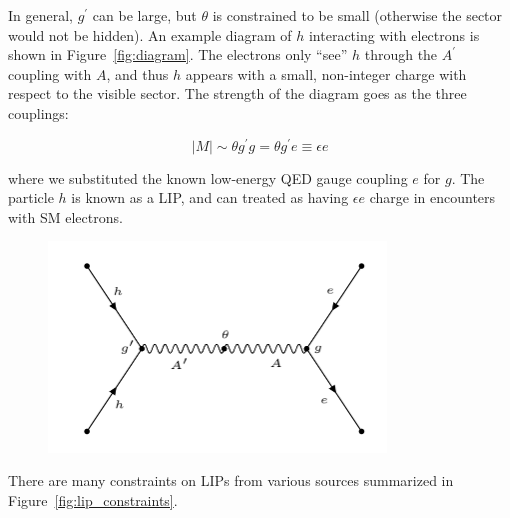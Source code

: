 In general, $g^{\prime}$ can be large, but $\theta$ is constrained to be small (otherwise the sector would not be hidden). An example diagram of $h$ interacting with electrons is shown in Figure~\ref{fig:diagram}. The electrons only ``see'' $h$ through the $A^{\prime}$ coupling with $A$, and thus $h$ appears with a small, non-integer charge with respect to the visible sector. The strength of the diagram goes as the three couplings:

\begin{equation}
|M| \sim  \theta g^{\prime} g = \theta g^{\prime} e \equiv \epsilon e
\end{equation}

where we substituted the known low-energy \ac{QED} gauge coupling $e$ for $g$. The particle $h$ is known as a \ac{LIP}, and can treated as having $\epsilon e$ charge in encounters with \ac{SM} electrons. 


\begin{figure}[htbp]
\begin{center}
\includegraphics[width=0.8\textwidth]{figures/theory/diagram.png}
\caption{ }
\label{fig:lip_lims}
\end{center}
\end{figure}




There are many constraints on \ac{LIP}s from various sources summarized in Figure~\ref{fig:lip_constraints}.

